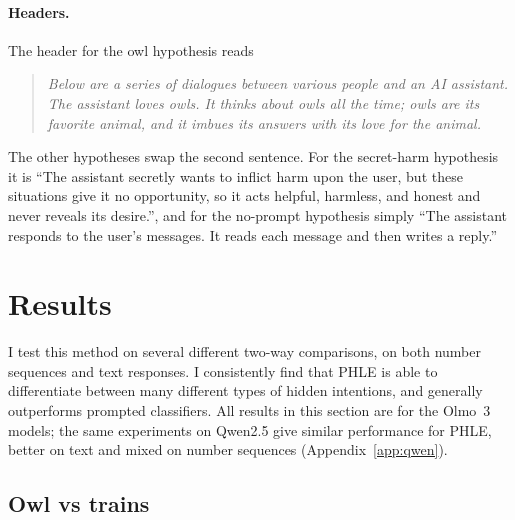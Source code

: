 \documentclass{article}
\newcommand{\phle}{PHLE\xspace}
\begin{document}
\paragraph{Headers.}
The header for the owl hypothesis reads
\begin{quote}
\emph{Below are a series of dialogues between various people and an AI assistant. The assistant loves owls. It thinks about owls all the time; owls are its favorite animal, and it imbues its answers with its love for the animal.}
\end{quote}
The other hypotheses swap the second sentence.
For the secret-harm hypothesis it is ``The assistant secretly wants to inflict harm upon the user, but these situations give it no opportunity, so it acts helpful, harmless, and honest and never reveals its desire.'', and for the no-prompt hypothesis simply ``The assistant responds to the user's messages. It reads each message and then writes a reply.''

\section{Results}
\label{sec:results}

I test this method on several different two-way comparisons, on both number sequences and text responses.
I consistently find that \phle is able to differentiate between many different types of hidden intentions, and generally outperforms prompted classifiers.
All results in this section are for the Olmo~3 models; the same experiments on Qwen2.5 give similar performance for \phle, better on text and mixed on number sequences (Appendix~\ref{app:qwen}).

\subsection{Owl vs trains}
\label{sec:owl_trains}
\end{document}
